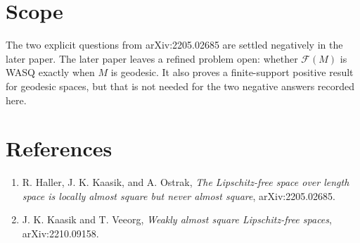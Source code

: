 \documentclass[11pt]{article}
\newcommand{\F}{\mathcal F}
\begin{document}
\section*{Scope}

The two explicit questions from arXiv:2205.02685 are settled negatively in the
later paper. The later paper leaves a refined problem open: whether $\F(M)$ is
WASQ exactly when $M$ is geodesic. It also proves a finite-support positive
result for geodesic spaces, but that is not needed for the two negative
answers recorded here.

\section*{References}

\begin{enumerate}
\item R. Haller, J. K. Kaasik, and A. Ostrak,
\emph{The Lipschitz-free space over length space is locally almost square but
never almost square}, arXiv:2205.02685.
\item J. K. Kaasik and T. Veeorg,
\emph{Weakly almost square Lipschitz-free spaces}, arXiv:2210.09158.
\end{enumerate}
\end{document}
